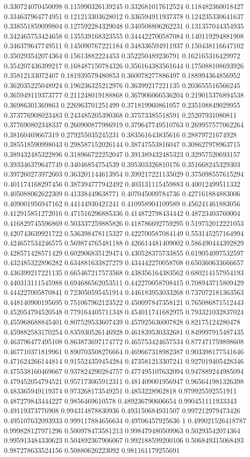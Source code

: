 \begin{table}
\begin{tabu}
\begin{sparkline}{10}
0.330724070450098 0.115990326139245 0.332681017612524 0.118482360018427 0.334637964774951 0.121213303628012 0.336594911937378 0.124235330641637 0.338551859099804 0.127592284329048 0.340508806262231 0.131357044354935 0.342465753424658 0.135539168323555 0.344422700587084 0.140119294881908 0.346379647749511 0.145090767221184 0.348336594911937 0.150438116647102 0.350293542074364 0.15613882224453 0.352250489236791 0.162165316429972 0.354207436399217 0.168487150784326 0.356164383561644 0.175088108693926 0.35812133072407 0.181939579480853 0.360078277886497 0.188994364856952 0.362035225048924 0.196236325212976 0.36399217221135 0.203655516566245 0.365949119373777 0.211248019188868 0.367906066536204 0.219015376894538 0.36986301369863 0.226963701251499 0.371819960861057 0.235108849029955 0.373776908023483 0.243485205390368 0.37573385518591 0.25207931080811 0.377690802348337 0.260900877986919 0.379647749510763 0.269957577062264 0.38160469667319 0.279255035245231 0.383561643835616 0.28879721674928 0.385518590998043 0.298587152026144 0.38747553816047 0.308627978963715 0.389432485322896 0.318966722252047 0.391389432485323 0.32957520693157 0.393346379647749 0.34046854754539 0.395303326810176 0.351668245329303 0.397260273972603 0.363201144613954 0.399217221135029 0.375098557615294 0.401174168297456 0.387394777942492 0.403131115459883 0.40012499511332 0.405088062622309 0.41338449638771 0.407045009784736 0.427161884883006 0.409001956947162 0.44144930421241 0.410958904109589 0.456241461883056 0.412915851272016 0.471516296885336 0.414872798434442 0.48723403760004 0.416829745596869 0.503337259885826 0.418786692759295 0.519752012221053 0.420743639921722 0.536398478115327 0.422700587084149 0.553145257164994 0.424657534246575 0.569874765481188 0.426614481409002 0.586490444392829 0.428571428571429 0.602906835129474 0.430528375733855 0.619054097532597 0.432485322896282 0.634881633827279 0.434442270058708 0.650360633666657 0.436399217221135 0.665467217573568 0.438356164383562 0.680214157954193 0.440313111545988 0.694686562053511 0.442270058708415 0.708943715809429 0.444227005870841 0.723050595451914 0.446183953033268 0.737072181363563 0.448140900195695 0.751067962123522 0.450097847358121 0.765086871512443 0.452054794520548 0.779164405711348 0.454011741682975 0.793321032837024 0.455968688845401 0.807529533607439 0.457925636007828 0.82175124280478 0.459882583170254 0.835930526146928 0.461839530332681 0.849997915487435 0.463796477495108 0.863873697174772 0.465753424657534 0.877471759898608 0.467710371819961 0.890703508276664 0.469667318982387 0.903398177541646 0.471624266144814 0.915524359454284 0.473581213307241 0.927019405428346 0.475538160469667 0.937824290284757 0.477495107632094 0.947889244985094 0.479452054794521 0.957173065912311 0.481409001956947 0.965641981326398 0.483365949119374 0.973268173549251 0.4853228962818 0.979925592551911 0.487279843444227 0.9856469610578 0.489236790606654 0.990451111933343 0.49119373776908 0.994314878830936 0.493150684931507 0.997212979473426 0.495107632093933 0.999117884656634 0.49706457925636 1 0.499021526418787 0.999828127971296 0.500978473581213 0.998479480509963 0.50293542074364 0.995913484330623 0.504892367906067 0.992188599200106 0.506849315068493 0.987278633524156 0.50880626223092 0.981161179255691 
\end{sparkline}
\end{tabu}
\end{table}
